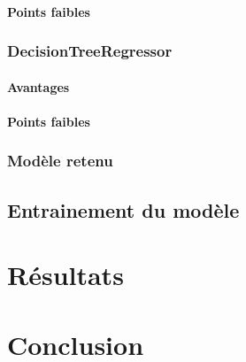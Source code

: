\paragraph{Points faibles}

\subsubsection{DecisionTreeRegressor}

\paragraph{Avantages}

\paragraph{Points faibles}

\subsubsection{Modèle retenu}




\subsection{Entrainement du modèle}



\section{Résultats}



\section{Conclusion}


